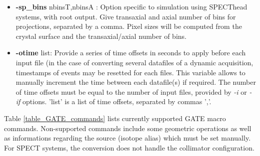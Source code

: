 \documentclass[a4paper, 11pt]{article}
\begin{document}
\begin{itemize}
  \item \textbf{-sp\_bins} nbinsT,nbinsA                      : Option specific to simulation using SPECThead systems, with root output. Give transaxial and axial number of bins for projections, separated by a comma. Pixel sizes will be computed from the crystal surface and the transaxial/axial number of bins.                   
  \item \textbf{-otime} list: Provide a series of time offsets in seconds to apply before each input file (in the case of converting several
        datafiles of a dynamic acquisition, timestamps of events may be resetted for each files. This variable allows to manually increment
        the time between each datafile(s) if required. The number of time offsets must be equal to the number of input files, provided by
        \textit{-i} or \textit{-if} options. 'list' is a list of time offsets, separated by commas ','.
\end{itemize}


Table \ref{table_GATE_commands} lists currently supported GATE macro commands. Non-supported commands include some geometric operations as well as informations regarding the source (isotope alias) which must be set manually. For SPECT systems, the conversion does not handle the collimator configuration.
\end{document}
